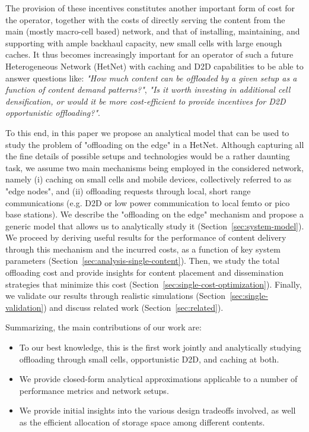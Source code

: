 \documentclass[10pt,conference,letterpaper]{IEEEtran}
\begin{document}
The provision of these incentives constitutes another important form of cost for the operator, together with the costs of directly serving the content from the main (mostly macro-cell based) network, and that of installing, maintaining, and supporting with ample backhaul capacity, new small cells with large enough caches. It thus becomes increasingly important for an operator of such a future Heterogeneous Network (HetNet) with caching and D2D capabilities to be able to answer questions like: \emph{"How much content can be offloaded by a given setup as a function of content demand patterns?"}, \emph{"Is it worth investing in additional cell densification, or would it be more cost-efficient to provide incentives for D2D opportunistic offloading?"}.   

To this end, in this paper we propose an analytical model that can be used to study the problem of "offloading on the edge" in a HetNet. Although capturing all the fine details of possible setups and technologies would be a rather daunting task, we assume two main mechanisms being employed in the considered network, namely (i) caching on small cells and mobile devices, collectively referred to as "edge nodes", and (ii) offloading requests through local, short range communications (e.g. D2D or low power communication to local femto or pico base stations).  We describe the "offloading on the edge" mechanism and propose a generic model that allows us to analytically study it (Section~\ref{sec:system-model}). We proceed by deriving useful results for the performance of content delivery through this mechanism and the incurred costs, as a function of key system parameters (Section~\ref{sec:analysis-single-content}). Then, we study the total offloading cost and provide insights for content placement and dissemination strategies that minimize this cost (Section~\ref{sec:single-cost-optimization}). Finally, we validate our results through realistic simulations (Section~\ref{sec:single-validation}) and discuss related work (Section~\ref{sec:related}).


Summarizing, the main contributions of our work are:\begin{itemize}
\item To our best knowledge, this is the first work jointly and analytically studying offloading through small cells, opportunistic D2D, and caching at both.   
\item We provide closed-form analytical approximations applicable to a number of performance metrics and network setups.
\item We provide initial insights into the various design tradeoffs involved, as well as the efficient allocation of storage space among different contents. 
\end{itemize}
\end{document}
